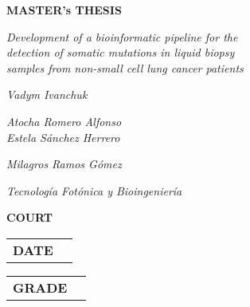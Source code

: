 \begin{titlepage}
\begin{large}
    \textbf{MASTER's THESIS}
        \signature{\break}{}
        \signature{Title}{\textit{Development of a bioinformatic pipeline for the \\ detection of somatic mutations in liquid biopsy \\ samples from non-small cell lung cancer patients}}
        \signature{Author}{\textit{Vadym Ivanchuk}}
        \signature{Supervisor}{\textit{Atocha Romero Alfonso \\ Estela Sánchez Herrero}}
        \signature{Tenured professor}{\textit{Milagros Ramos Gómez}}
        \signature{Department}{\textit{Tecnología Fotónica y Bioingeniería}}
        \signature{\break}{}
    \textbf{COURT}
        \signature{\break}{}
        \signature{President}{\textit{}}
        \signature{Vocal}{\textit{}}
        \signature{Secretary}{\textit{}}
        \signature{Substitute}{\textit{}}
        \signature{\break}{}
    \hspace*{2.05cm}\begin{tabular}{c | c}
        \textbf{DATE} & \\
    \end{tabular}
    \newline \break
    \hspace*{-1.93cm}\begin{tabular}{c | c}
        \textbf{GRADE} & \\
    \end{tabular}
\end{large}
\end{titlepage}
